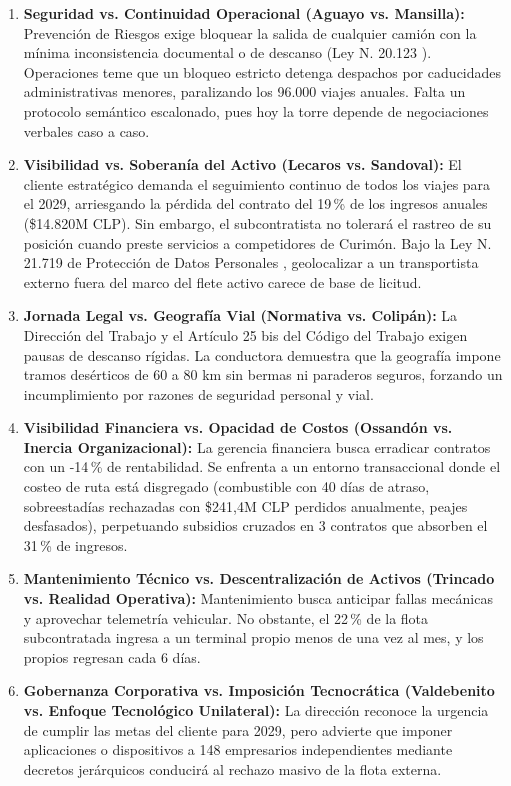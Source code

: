 \begin{enumerate}
    \item \textbf{Seguridad vs. Continuidad Operacional (Aguayo vs. Mansilla):} Prevención de Riesgos exige bloquear la salida de cualquier camión con la mínima inconsistencia documental o de descanso (Ley N.\textordmasculine{} 20.123 \parencite{ley20123}). Operaciones teme que un bloqueo estricto detenga despachos por caducidades administrativas menores, paralizando los 96.000 viajes anuales. Falta un protocolo semántico escalonado, pues hoy la torre depende de negociaciones verbales caso a caso.
    \item \textbf{Visibilidad vs. Soberanía del Activo (Lecaros vs. Sandoval):} El cliente estratégico demanda el seguimiento continuo de todos los viajes para el 2029, arriesgando la pérdida del contrato del 19\,\% de los ingresos anuales (\$14.820M CLP). Sin embargo, el subcontratista no tolerará el rastreo de su posición cuando preste servicios a competidores de Curimón. Bajo la Ley N.\textordmasculine{} 21.719 de Protección de Datos Personales \parencite{ley21719}, geolocalizar a un transportista externo fuera del marco del flete activo carece de base de licitud.
    \item \textbf{Jornada Legal vs. Geografía Vial (Normativa vs. Colipán):} La Dirección del Trabajo y el Artículo 25 bis del Código del Trabajo \parencite{codigo_trabajo_25bis} exigen pausas de descanso rígidas. La conductora demuestra que la geografía impone tramos desérticos de 60 a 80 km sin bermas ni paraderos seguros, forzando un incumplimiento por razones de seguridad personal y vial.
    \item \textbf{Visibilidad Financiera vs. Opacidad de Costos (Ossandón vs. Inercia Organizacional):} La gerencia financiera busca erradicar contratos con un -14\,\% de rentabilidad. Se enfrenta a un entorno transaccional donde el costeo de ruta está disgregado (combustible con 40 días de atraso, sobreestadías rechazadas con \$241,4M CLP perdidos anualmente, peajes desfasados), perpetuando subsidios cruzados en 3 contratos que absorben el 31\,\% de ingresos.
    \item \textbf{Mantenimiento Técnico vs. Descentralización de Activos (Trincado vs. Realidad Operativa):} Mantenimiento busca anticipar fallas mecánicas y aprovechar telemetría vehicular. No obstante, el 22\,\% de la flota subcontratada ingresa a un terminal propio menos de una vez al mes, y los propios regresan cada 6 días.
    \item \textbf{Gobernanza Corporativa vs. Imposición Tecnocrática (Valdebenito vs. Enfoque Tecnológico Unilateral):} La dirección reconoce la urgencia de cumplir las metas del cliente para 2029, pero advierte que imponer aplicaciones o dispositivos a 148 empresarios independientes mediante decretos jerárquicos conducirá al rechazo masivo de la flota externa.
\end{enumerate}

